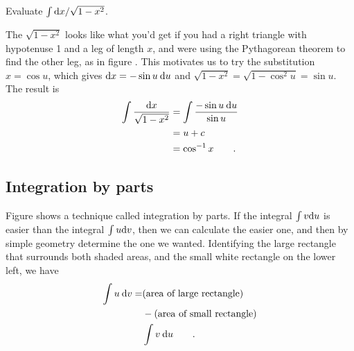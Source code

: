 \begin{eg}
\egquestion Evaluate $\int \textup{d} x/\sqrt{1-x^2}$.

\eganswer The $\sqrt{1-x^2}$ looks like what you'd get if you had a right
triangle with hypotenuse 1 and a leg of length $x$, and were using the
Pythagorean theorem to find the other leg, as in figure .
This motivates us to try the substitution $x=\cos u$, which gives
$\textup{d} x=-\sin u\:\textup{d} u$ and $\sqrt{1-x^2}=\sqrt{1-\cos^2u}=\sin u$. The result is
\begin{align*}
  \int \frac{\textup{d} x}{\sqrt{1-x^2}} &= \int \frac{-\sin u\:\textup{d} u}{\sin u} \\
                 &= u+c \\
                 &= \cos^{-1}x \qquad .
\end{align*}
\end{eg}
%

\subsection{Integration by parts}

Figure  shows a technique called integration by parts.
If the integral $\int v\textup{d} u$ is easier than the integral $\int u\textup{d} v$,
then we can calculate the easier one, and then by simple geometry determine
the one we wanted. Identifying the large rectangle that surrounds both
shaded areas, and the small white rectangle on the lower left, we have
\begin{align*}
  \int u\:\textup{d} v =& (\text{area of large rectangle})\\
                &-(\text{area of small rectangle})\\
                &\int v\:\textup{d} u \qquad .
\end{align*}


